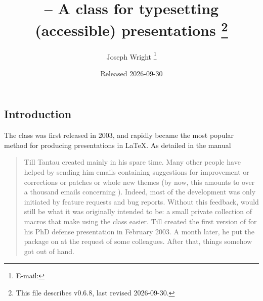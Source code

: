 \documentclass{l3doc}
\makeatletter
\let\acro\@firstofone
\def\filedate{2026-09-30}
\def\fileversion{v0.6.8}
\makeatother
\begin{document}
\title{%
   -- A class for typesetting (accessible) presentations%
  \thanks{This file describes \fileversion,
    last revised \filedate.}%
}

\author{%
  Joseph Wright%
  \thanks{%
    E-mail: %
  }%
}

\date{Released \filedate}

\maketitle

\tableofcontents

\begin{documentation}

\section{Introduction%
  \label{sec:intro}}

The  class was first released in 2003, and rapidly became the
most popular method for producing presentations in \LaTeX{}. As detailed in
the  manual
\begin{quotation}
  Till Tantau created  mainly in his spare time. Many other people
  have helped by sending him emails containing suggestions for improvement or
  corrections or patches or whole new themes (by now, this amounts to over a
  thousand emails concerning ). Indeed, most of the development was
  only initiated by feature requests and bug reports. Without this feedback,
   would still be what it was originally intended to be: a small
  private collection of macros that make using the  class easier.
  Till created the first version of  for his PhD defense
  presentation in February 2003. A month later, he put the package on
  \acro{ctan} at the request of some colleagues. After that, things somehow got
  out of hand.
\end{quotation}


\end{documentation}
\end{document}
